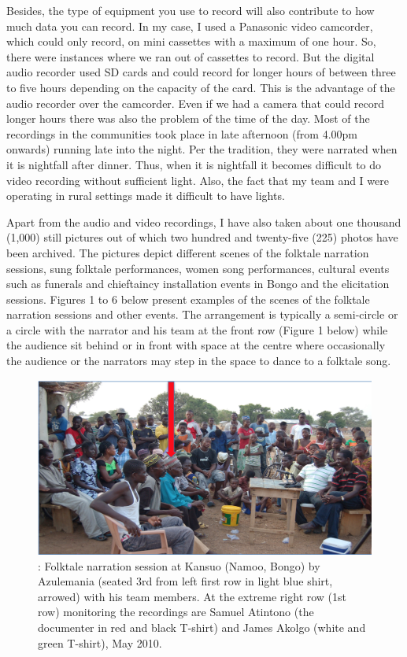 \documentclass[output=paper,colorlinks,citecolor=brown]{langscibook}
\begin{document}
Besides, the type of equipment you use to record will also contribute to how much data you can record.  In my case, I used a Panasonic video camcorder, which could only record, on mini cassettes with a maximum of one hour. So, there were instances where we ran out of cassettes to record. But the digital audio recorder used SD cards and could record for longer hours of between three to five hours depending on the capacity of the card.  This is the advantage of the audio recorder over the camcorder. Even if we had a camera that could record longer hours there was also the problem of the time of the day. Most of the recordings in the communities took place in  late afternoon (from 4.00pm onwards) running late into the night. Per the tradition, they were narrated when it is nightfall after dinner. Thus, when it is nightfall it becomes difficult to do video recording without sufficient light. Also, the fact that my team and I were operating in rural settings made it difficult to have lights.

Apart from the audio and video recordings, I have also taken about one thousand (1,000) still pictures out of which two hundred and twenty-five (225) photos have been archived. The pictures depict different scenes of the folktale narration sessions, sung folktale performances, women song performances, cultural events such as funerals and chieftaincy installation events in Bongo and the elicitation sessions. Figures 1 to 6 below present examples of the scenes of the folktale narration sessions and other events. The arrangement is typically a semi-circle or a circle with the narrator and his team at the front row (Figure 1 below) while the audience sit behind or in front with space at the centre where occasionally the audience or the narrators may step in the space to dance to a folktale song.

\begin{figure}
\includegraphics[scale=0.55]{figures/azulemania.png}
\caption{: Folktale narration session at Kansuo (Namoo, Bongo) by Azulemania (seated 3rd from left first row 
 	 in light blue shirt, arrowed) with his team members. At the extreme right row (1st row) monitoring 
 	the recordings are Samuel Atintono (the documenter in red and black T-shirt) and James Akolgo 
 	(white and green T-shirt), May 2010.}

\end{figure}
\end{document}
